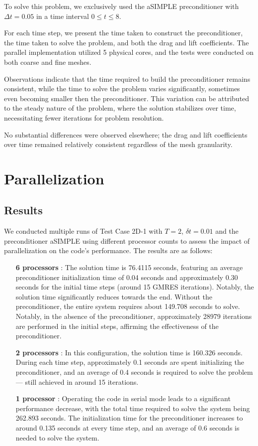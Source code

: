 \documentclass{article}
\begin{document}
To solve this problem, we exclusively used the aSIMPLE preconditioner with \(\Delta t = 0.05\) in a time interval \(0 \leq t \leq 8\).

For each time step, we present the time taken to construct the preconditioner, the time taken to solve the problem, and both the drag and lift coefficients. The parallel implementation utilized 5 physical cores, and the tests were conducted on both coarse and fine meshes.

Observations indicate that the time required to build the preconditioner remains consistent, while the time to solve the problem varies significantly, sometimes even becoming smaller then the preconditioner. This variation can be attributed to the steady nature of the problem, where the solution stabilizes over time, necessitating fewer iterations for problem resolution.

No substantial differences were observed elsewhere; the drag and lift coefficients over time remained relatively consistent regardless of the mesh granularity.


\section{Parallelization}

\subsection*{Results}
We conducted multiple runs of Test Case 2D-1 with \(T = 2\), \(\delta t = 0.01\) and the preconditioner aSIMPLE using different processor counts to assess the impact of parallelization on the code's performance. The results are as follows:

\begin{itemize}
    \item [\textbf{6 processors}]: The solution time is 76.4115 seconds, featuring an average preconditioner initialization time of 0.04 seconds and approximately 0.30 seconds for the initial time steps (around 15 GMRES iterations). Notably, the solution time significantly reduces towards the end. Without the preconditioner, the entire system requires about 149.708 seconds to solve. Notably, in the absence of the preconditioner, approximately 28979 iterations are performed in the initial steps, affirming the effectiveness of the preconditioner.

    \item[\textbf{2 processors}]: In this configuration, the solution time is 160.326 seconds. During each time step, approximately 0.1 seconds are spent initializing the preconditioner, and an average of 0.4 seconds is required to solve the problem — still achieved in around 15 iterations.

    \item[\textbf{1 processor}]: Operating the code in serial mode leads to a significant performance decrease, with the total time required to solve the system being 262.893 seconds. The initialization time for the preconditioner increases to around 0.135 seconds at every time step, and an average of 0.6 seconds is needed to solve the system.
\end{itemize}
\end{document}
